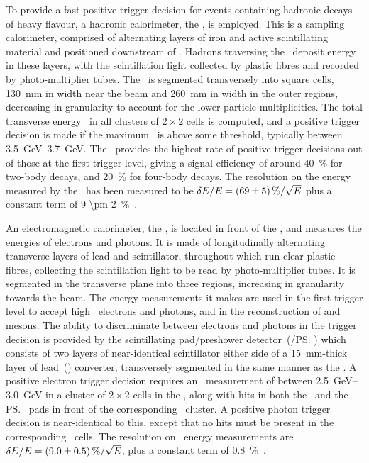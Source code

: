 To provide a fast positive trigger decision for events containing hadronic 
decays of heavy flavour, a hadronic calorimeter, the \hcal, is employed.
This is a sampling calorimeter, comprised of alternating layers of iron and 
active scintillating material and positioned downstream of \richtwo.
Hadrons traversing the \hcal\ deposit energy in these layers, with the 
scintillation light collected by plastic fibres and recorded by 
photo-multiplier tubes.
The \hcal\ is segmented transversely into square cells, \SI{130}{\milli\metre} 
in width near the beam and \SI{260}{\milli\metre} in width in the outer 
regions, decreasing in granularity to account for the lower particle 
multiplicities.
The total transverse energy \ET\ in all clusters of $2\times2$ cells is 
computed, and a positive trigger decision is made if the maximum \ET\ is above 
some threshold, typically between \SIrange{3.5}{3.7}{\GeV}.
The \hcal\ provides the highest rate of positive trigger decisions out of those 
at the first trigger level, giving a signal efficiency of around 
\SI{40}{\percent} for two-body \PB decays, and \SI{20}{\percent} for four-body 
\PD decays.
The resolution on the energy measured by the \hcal\ has been measured to be 
$\unc{E}/E = \SI{69 \pm 5}{\percent}/\sqrt{E}$ plus a constant term of \SI{9 
  \pm 2}{\percent}~\cite{Perret:2015pla}.

An electromagnetic calorimeter, the \ecal, is located in front of the \hcal, 
and measures the energies of electrons and photons.
It is made of longitudinally alternating transverse layers of lead and 
scintillator, throughout which run clear plastic fibres, collecting the 
scintillation light to be read by photo-multiplier tubes.
It is segmented in the transverse plane into three regions, increasing in 
granularity towards the beam.
The energy measurements it makes are used in the first trigger level to accept 
high \ET\ electrons and photons, and in the reconstruction of \Ppizero and 
\Peta mesons.
The ability to discriminate between electrons and photons in the trigger 
decision is provided by the scintillating pad/preshower detector~(\spd/\ps) 
which consists of two layers of near-identical scintillator either side of a 
\SI{15}{\milli\metre}-thick layer of lead~() converter, transversely 
segmented in the same manner as the \ecal.
A positive electron trigger decision requires an \ET\ measurement of between 
\SIrange{2.5}{3.0}{\GeV} in a cluster of $2\times2$ cells in the \ecal, along 
with hits in both the \spd\ and the \ps\ pads in front of the corresponding 
\ecal\ cluster.  A positive photon trigger decision is near-identical to this, 
except that no hits must be present in the corresponding \spd\ cells.
The resolution on \ecal\ energy measurements are $\unc{E}/E = \SI{9 \pm 
  0.5}{\percent}/\sqrt{E}$, plus a constant term of 
\SI{0.8}{\percent}~\cite{Perret:2015pla}.

